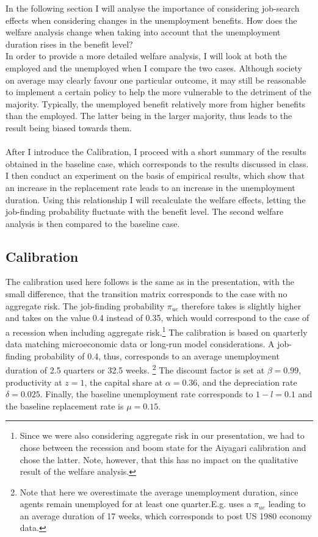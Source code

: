\documentclass[a4paper,12pt]{article}
\begin{document}
In the following section I will analyse the importance of considering job-search effects when considering changes in the unemployment benefits. How does the welfare analysis change when taking into account that the unemployment duration rises in the benefit level? \\
In order to provide a more detailed welfare analysis, I will look at both the employed and the unemployed when I compare the two cases. Although society on average may clearly favour one particular outcome, it may still be reasonable to implement a certain policy to help the more vulnerable to the detriment of the majority. Typically, the unemployed benefit relatively more from higher benefits than the employed. The latter being in the larger majority, thus leads to the result being biased towards them. 
\\ \\
After I introduce the Calibration, I proceed with a short summary of the results obtained in the baseline case, which corresponds to the results discussed in class.
I then conduct an experiment on the basis of empirical results, which show that an increase in the replacement rate leads to an increase in the unemployment duration. Using this relationship I will recalculate the welfare effects, letting the job-finding probability fluctuate with the benefit level. The second welfare analysis is then compared to the baseline case. 


\subsection{Calibration}

The calibration used here follows \cite{DenHaan20101} is the same as in the presentation, with the small difference, that the transition matrix corresponds to the case with no aggregate risk. The job-finding probability $\pi_{ue}$ therefore takes is slightly higher and takes on the value 0.4 instead of 0.35, which would correspond to the case of a recession when including aggregate risk.\footnote{Since we were also considering aggregate risk in our presentation, we had to chose between the recession and boom state for the Aiyagari calibration and chose the latter. Note, however, that this has no impact on the qualitative result of the welfare analysis.} The calibration is based on quarterly data matching microeconomic data or long-run model considerations. A job-finding probability of 0.4, thus, corresponds to an average unemployment duration of 2.5 quarters or 32.5 weeks. \footnote{Note that here we overestimate the average unemployment duration, since agents remain unemployed for at least one quarter.E.g. \cite{mukoyama} uses a $\pi_{ue}$ leading to an average duration of 17 weeks, which corresponds to post US 1980 economy data.} The discount factor is set at $\beta = 0.99$, productivity at $z = 1$, the capital share at $\alpha = 0.36$, and the depreciation rate $\delta = 0.025$. Finally, the baseline unemployment rate corresponds to  $1- l=0.1$ and the baseline replacement rate is $\mu = 0.15$.
\end{document}
